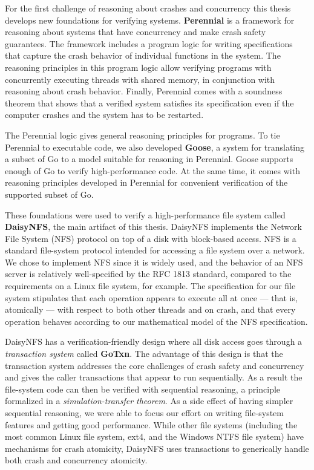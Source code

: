 For the first challenge of reasoning about crashes and concurrency this thesis
develops new foundations for verifying systems. \textbf{Perennial} is a
framework for reasoning about systems that have concurrency and make crash
safety guarantees. The framework includes a program logic for writing
specifications that capture the crash behavior of individual functions in the
system. The reasoning principles in this program logic allow verifying
programs with concurrently executing threads with shared memory, in conjunction
with reasoning about crash behavior. Finally, Perennial comes with a soundness
theorem that shows that a verified system satisfies its specification even if
the computer crashes and the system has to be restarted.

The Perennial logic gives general reasoning principles for programs. To tie
Perennial to executable code, we also developed \textbf{Goose}, a system for
translating a subset of Go to a model suitable for reasoning in Perennial. Goose
supports enough of Go to verify high-performance code. At the same time, it
comes with reasoning principles developed in Perennial for convenient
verification of the supported subset of Go.

These foundations were used to verify a high-performance file system called
\textbf{DaisyNFS}, the main artifact of this thesis. DaisyNFS implements the Network
File System (NFS) protocol on top of a disk with block-based access. NFS is a
standard file-system protocol intended for accessing a file system over a network.
We chose to
implement NFS since it is widely used, and the behavior of an NFS server is relatively well-specified
by the RFC 1813 standard, compared to the requirements on a Linux file system,
for example. The specification for our file system stipulates that each
operation appears to execute all at once --- that is, atomically --- with
respect to both other threads and on crash, and that every operation behaves
according to our mathematical model of the NFS specification.

DaisyNFS has a verification-friendly design where all disk access goes through a
\emph{transaction system} called \textbf{GoTxn}. The advantage of this design is that the
transaction system addresses the core challenges of crash safety and concurrency
and gives the caller transactions that appear to run sequentially. As a result the file-system code can then be verified with sequential
reasoning, a principle formalized in a \emph{simulation-transfer theorem}.
As a side effect of having simpler sequential reasoning, we were
able to focus our effort on writing file-system features and getting good
performance. While other file systems (including the most common Linux file
system, ext4, and the Windows NTFS file system) have mechanisms for crash atomicity, DaisyNFS
uses transactions to generically handle both crash and concurrency atomicity.

